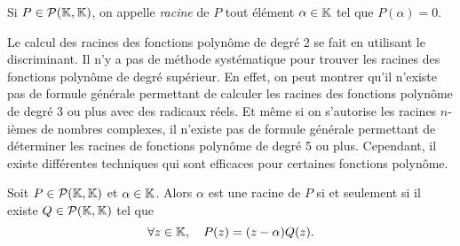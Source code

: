 \documentclass{magnoliaold}
\begin{document}
\begin{definition}
  Si $P\in\mathcal{P}(\mathbb{K},\mathbb{K})$, on appelle \emph{racine} de $P$ tout élément $\alpha\in\mathbb{K}$ tel que $P(\alpha)=0$.
  \end{definition}
  
  \begin{remarques}
  \remarque Le calcul
  des racines des fonctions polynôme de degré 2 se fait en utilisant le discriminant.
  \remarque Il n'y a pas de méthode
  systématique pour trouver les racines des fonctions polynôme de degré supérieur. En effet, on peut montrer qu'il
  n'existe pas de formule générale permettant de calculer les racines des fonctions polynôme de degré 3 ou plus avec
  des radicaux réels. Et même si on s'autorise les racines $n$-ièmes de nombres complexes, il n'existe pas
  de formule générale permettant de déterminer les racines de fonctions polynôme de degré 5 ou plus. Cependant, il
  existe différentes techniques qui sont efficaces pour certaines fonctions polynôme.
  \end{remarques}
  
  \begin{proposition}
  Soit $P\in\mathcal{P}(\mathbb{K},\mathbb{K})$ et $\alpha\in\mathbb{K}$. Alors $\alpha$ est une racine de $P$ si et seulement si il existe
  $Q\in\mathcal{P}(\mathbb{K},\mathbb{K})$ tel que
  \[\forall z\in\mathbb{K},\quad P(z)=(z-\alpha)Q(z).\]
  \end{proposition}
  
\end{document}
